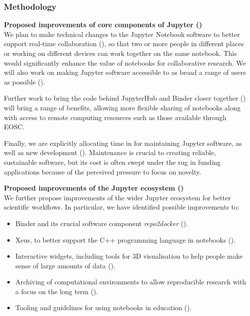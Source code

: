 \subsubsection{Methodology}\label{sec:methodology}


\textbf{Proposed improvements of core components of Jupyter ()}\\
We plan to make technical changes to the Jupyter Notebook software to better support
real-time collaboration (),
so that two or more people in different places or working on different
devices can work together
on the same notebook. This would significantly enhance the value of
notebooks for collaborative research.
We will also work on making Jupyter software accessible to as broad a
range of users as possible ().

Further work to bring the code behind JupyterHub and Binder closer together
() will bring a range of benefits, allowing more
flexible sharing of notebooks along with access to remote computing resources
such as those available through EOSC.

Finally, we are explicitly allocating time in  for maintaining
Jupyter software, as well as new development ().
Maintenance is crucial to creating reliable, sustainable software,
but its cost is often swept under the rug in funding applications
because of the perceived pressure to focus on novelty.

\medskip
\noindent\textbf{Proposed improvements of the Jupyter ecosystem ()}\\
We further propose improvements of the wider Jupyter ecosystem for
better scientific workflows. In particular, we have identified
possible improvements to:

\begin{itemize}
  \item Binder and its crucial software component \emph{repo2docker}
    ().

  \item Xeus, to better support the C++ programming language in notebooks
    ().

  \item Interactive widgets, including tools for 3D visualisation to help
    people make sense of large amounts of data
    ().

  \item Archiving of computational environments to allow reproducible research
    with a focus on the long term ().

  \item Tooling and guidelines
    for using notebooks in education
    ().

\end{itemize}

